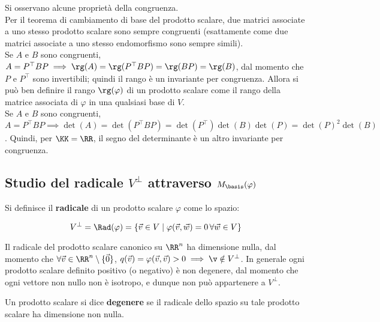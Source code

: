 \begin{remark}
	Si osservano alcune proprietà della congruenza. \\
	
	\li Per il teorema di cambiamento di base del prodotto scalare, due matrici associate a uno stesso
	prodotto scalare sono sempre congruenti (esattamente come due matrici associate a uno stesso
	endomorfismo sono sempre simili). \\
	\li Se $A$ e $B$ sono congruenti, $A = P^\top B P \implies \rg(A) = \rg(P^\top B P) = \rg(BP) = \rg(B)$,
	dal momento che $P$ e $P^\top$ sono invertibili; quindi il rango è un invariante per congruenza. Allora
	si può ben definire il rango $\rg(\varphi)$ di un prodotto scalare come il rango della matrice
	associata di $\varphi$ in una qualsiasi base di $V$. \\
	\li Se $A$ e $B$ sono congruenti, $A = P^\top B P \implies \det(A) = \det(P^\top B P) = \det(P^\top) \det(B) \det(P)=
	\det(P)^2 \det(B)$. Quindi, per $\KK = \RR$, il segno del determinante è un altro invariante per congruenza.
\end{remark}

\subsection{Studio del radicale \texorpdfstring{$V^\perp$}{V⟂} attraverso \texorpdfstring{$M_\basis(\varphi)$}{M\_B(φ)}}

\begin{definition}
	Si definisce il \textbf{radicale} di un prodotto scalare $\varphi$ come lo spazio:
	
	\[ V^\perp = \Rad(\varphi) = \{ \vec{v} \in V \mid \varphi(\vec{v}, \vec{w}) = 0 \, \forall \vec{w} \in V \} \]
	
	\vskip 0.05in
\end{definition}

\begin{remark}
	Il radicale del prodotto scalare canonico su $\RR^n$ ha dimensione nulla, dal momento che $\forall \vec{v} \in \RR^n \setminus \{\vec{0}\}$, $q(\vec{v}) = \varphi(\vec{v}, \vec{v}) > 0 \implies \v \notin V^\perp$. In
	generale ogni prodotto scalare definito positivo (o negativo) è non degenere, dal momento che ogni vettore
	non nullo non è isotropo, e dunque non può appartenere a $V^\perp$.
\end{remark}

\begin{definition}
	Un prodotto scalare si dice \textbf{degenere} se il radicale dello spazio su tale prodotto scalare ha
	dimensione non nulla.
\end{definition}

